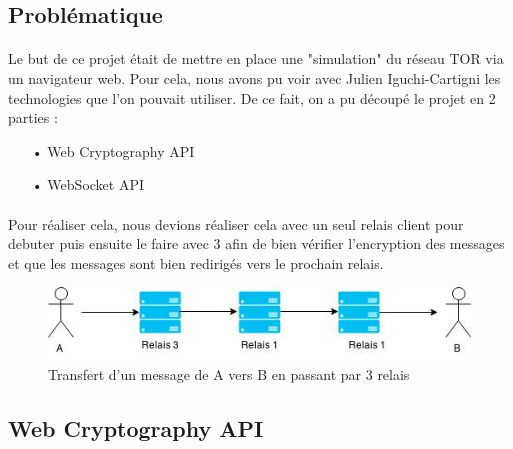 \documentclass[a4paper,12pt]{report}
\begin{document}
	\subsection{Problématique}
	\paragraph*{}
	Le but de ce projet était de mettre en place une "simulation" du réseau TOR via un navigateur web. Pour cela, nous avons pu voir avec Julien Iguchi-Cartigni les technologies que l'on pouvait utiliser. De ce fait, on a pu découpé le projet en 2 parties : 
	\begin{itemize}
		\item[•] Web Cryptography API
		\item[•] WebSocket API
	\end{itemize}
	\paragraph*{}
	Pour réaliser cela, nous devions réaliser cela avec un seul relais client pour debuter puis ensuite le faire avec 3 afin de bien vérifier l'encryption des messages et que les messages sont bien redirigés vers le prochain relais.
	\begin{figure}[h] %
		\includegraphics[scale=0.8]{project.jpg}
		\caption{Transfert d'un message de A vers B en passant par 3 relais}
		\label{project}
	\end{figure}
	
	\subsection{Web Cryptography API}
\end{document}
